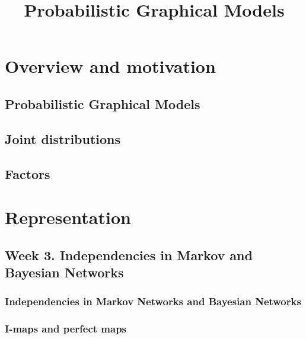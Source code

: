 \documentclass[a4paper,10pt]{article}
\title{Probabilistic Graphical Models}
\author{}
\begin{document}
\maketitle

\section{Overview and motivation}

\subsection{Probabilistic Graphical Models}



\subsection{Joint distributions}



\subsection{Factors}




\section{Representation}

\subsection{Week 3. Independencies in Markov and Bayesian Networks}

\subsubsection{Independencies in Markov Networks and Bayesian Networks}



\subsubsection{I-maps and perfect maps}
\end{document}

